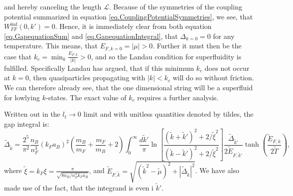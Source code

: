 and hereby canceling the length $\mathcal{L}$. Because of the symmetries of the coupling potential summarized in equation \eqref{eq.CouplingPotentialSymmetries}, we see, that $W^\text{ind}_{FF}(0,k') = 0$. Hence, it is immediately clear from both equation \eqref{eq.GapequationSum} and \eqref{eq.GapequationIntegral}, that $\Delta_{k=0} = 0$ for any temperature. This means, that $E_{F,k=0} = |\mu| > 0$. Further it must then be the case that $k_c = \min_k \frac{E_{F,k}}{|k|} > 0$, and so the Landau condition for superfluidity is fulfilled\cite{LandauStatPhys2,PlischkeStatPhys}.
Specifically Landau has argued, that if this minimum $k_c$ does not occur at $k=0$, then quasiparticles propagating with $|k|< k_c$ will do so without friction. We can therefore already see, that the one dimensional string will be a superfluid for lowlying $k$-states. The exact value of $k_c$ requires a further analysis. 

Written out in the $l_t \to 0$ limit and with unitless quantities denoted by tildes, the gap integral is:
\begin{equation}
\tilde{\Delta}_{\tilde{k}} = \frac{2^5}{\pi^2}\frac{n_B}{n_F^3}(k_Fa_B)^2\left(\frac{m_B}{m_F} + \frac{m_F}{m_B} + 2\right) \int_0^\infty \frac{d\tilde{k}'}{\pi} \ln\left[\frac{(\tilde{k}+\tilde{k}')^2+2/\tilde{\xi}^2}{(\tilde{k}-\tilde{k}')^2+2/\tilde{\xi}^2}\right] \frac{\tilde{\Delta}_{\tilde{k}'}}{2\tilde{E}_{F,\tilde{k}'}}\tanh\left(\frac{\tilde{E}_{F,k}}{2\tilde{T}}\right),
\label{eq.GapequationIntegralUnitless}
\end{equation} 
where $\tilde{\xi} = k_F\xi = \frac{\pi}{\sqrt{8 n_B/n_F^3 k_Fa_B}}$, and $\tilde{E}_{F,\tilde{k}} = \sqrt{(\tilde{k}^2-\tilde{\mu})^2 + |\tilde{\Delta}_{\tilde{k}}|^2}$. We have also made use of the fact, that the integrand is even i $\tilde{k}'$.

